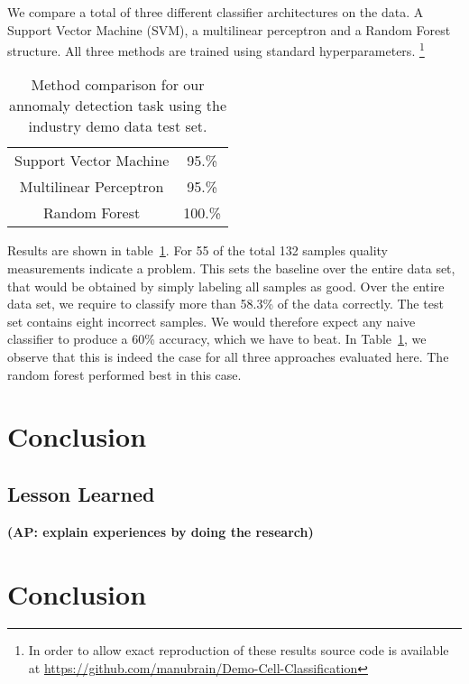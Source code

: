 \documentclass[5p,times,procedia]{elsarticle}
\newcommand{\AP}[1]{{\color{blue} {\bf (AP: #1)}}}
\begin{document}
We compare a total of three different classifier architectures on the data.
A Support Vector Machine (SVM), a multilinear perceptron and a Random Forest
structure. All three methods are trained using standard hyperparameters.
\footnote{In order to allow exact reproduction of these results source
code is available at \url{https://github.com/manubrain/Demo-Cell-Classification}}
\begin{table}
       \centering
       \begin{tabular}{ c c }
              Support Vector Machine & 95.\% \\
              Multilinear Perceptron & 95.\% \\
              Random Forest          & 100.\%
       \end{tabular}
       \caption{Method comparison for our annomaly detection task 
                using the industry demo data test set.}
       \label{tab:class_comp}
\end{table}
Results are shown in table~\ref{tab:class_comp}. For 55 of the total 132 samples
quality measurements indicate a problem. This sets the 
baseline over the entire data set, that would be obtained by simply labeling all samples
as good. Over the entire data set, we require to classify more than 58.3\% of the data correctly.
The test set contains eight incorrect samples. We would therefore expect any naive classifier
to produce a 60\% accuracy, which we have to beat. In Table~\ref{tab:class_comp},
we observe that this is indeed the case for all three approaches evaluated here.
The random forest performed best in this case.

\section{Conclusion}

\subsection{Lesson Learned} %

\AP{explain experiences by doing the research}

\section{Conclusion} %





\end{document}
